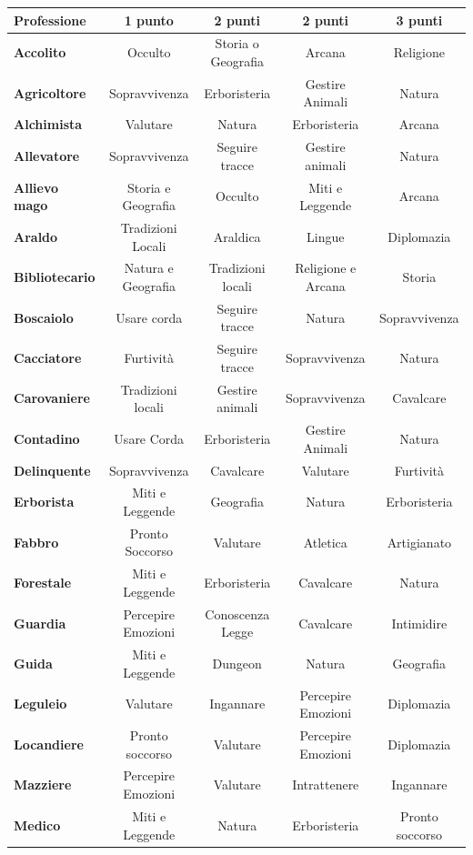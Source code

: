 \medskip

\noindent\begin{tabularx}{\textwidth}{|>{\raggedright\arraybackslash}l|c|c|c|c|}
\textbf{Professione}& \textbf{1 punto} & \textbf{2 punti} & \textbf{2 punti} & \textbf{3 punti}\\
\toprule
\textbf{Accolito}& Occulto& Storia o Geografia& Arcana& Religione\\
\textbf{Agricoltore}& Sopravvivenza &Erboristeria& Gestire Animali & Natura\\
\textbf{Alchimista}& Valutare&Natura& Erboristeria& Arcana\\
\textbf{Allevatore}& Sopravvivenza&Seguire tracce& Gestire animali&Natura \\
\textbf{Allievo mago}& Storia e Geografia&Occulto&Miti e Leggende&Arcana\\
\textbf{Araldo} & Tradizioni Locali & Araldica & Lingue & Diplomazia \\
\textbf{Bibliotecario}& Natura e Geografia&Tradizioni locali&Religione e Arcana&Storia\\
\textbf{Boscaiolo}& Usare corda&Seguire tracce & Natura& Sopravvivenza\\
\textbf{Cacciatore}& Furtività&Seguire tracce&Sopravvivenza& Natura\\
\textbf{Carovaniere}&Tradizioni locali &Gestire animali&Sopravvivenza&Cavalcare\\
\textbf{Contadino} & Usare Corda & Erboristeria & Gestire Animali& Natura\\
\textbf{Delinquente}& Sopravvivenza&Cavalcare&Valutare&Furtività\\
\textbf{Erborista}& Miti e Leggende&Geografia&Natura&Erboristeria\\
\textbf{Fabbro} & Pronto Soccorso & Valutare&Atletica & Artigianato \\
\textbf{Forestale}& Miti e Leggende&Erboristeria&Cavalcare & Natura\\
\textbf{Guardia}& Percepire Emozioni&Conoscenza Legge&Cavalcare&Intimidire\\
\textbf{Guida}& Miti e Leggende&Dungeon&Natura&Geografia\\
\textbf{Leguleio}& Valutare&Ingannare&Percepire Emozioni&Diplomazia\\
\textbf{Locandiere}& Pronto soccorso&Valutare&Percepire Emozioni&Diplomazia\\
\textbf{Mazziere}& Percepire Emozioni&Valutare&Intrattenere&Ingannare\\
\textbf{Medico}& Miti e Leggende&Natura&Erboristeria&Pronto soccorso\\

\end{tabularx}
